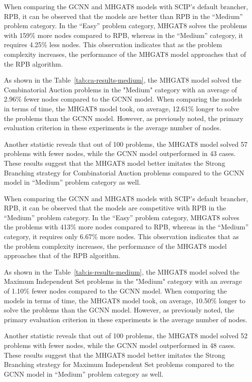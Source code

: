 When comparing the GCNN and MHGAT8 models with SCIP’s default brancher, RPB, it can be observed that the models are better than RPB in the “Medium” problem category.
In the “Easy” problem category, MHGAT8 solves the problems with 159\% more nodes compared to RPB, whereas in the “Medium” category, it requires 4.25\% less nodes.
This observation indicates that as the problem complexity increases, the performance of the MHGAT8 model approaches that of the RPB algorithm.




As shown in the Table~\ref{tab:ca-results-medium}, the MHGAT8 model solved the Combinatorial Auction problems in the "Medium" category with an average of 2.96\% fewer nodes compared to the GCNN model.
When comparing the models in terms of time, the MHGAT8 model took, on average, 12.61\% longer to solve the problems than the GCNN model.
However, as previously noted, the primary evaluation criterion in these experiments is the average number of nodes.


Another statistic reveals that out of 100 problems, the MHGAT8 model solved 57 problems with fewer nodes, while the GCNN model outperformed in 43 cases.
These results suggest that the MHGAT8 model better imitates the Strong Branching strategy for Combinatorial Auction problems compared to the GCNN model in “Medium” problem category as well.


When comparing the GCNN and MHGAT8 models with SCIP’s default brancher, RPB, it can be observed that the models are competitive with RPB in the “Medium” problem category.
In the “Easy” problem category, MHGAT8 solves the problems with 413\% more nodes compared to RPB, whereas in the “Medium” category, it requires only 6.67\% more nodes.
This observation indicates that as the problem complexity increases, the performance of the MHGAT8 model approaches that of the RPB algorithm.




As shown in the Table~\ref{tab:is-results-medium}, the MHGAT8 model solved the Maximum Independent Set problems in the "Medium" category with an average of 1.10\% fewer nodes compared to the GCNN model.
When comparing the models in terms of time, the MHGAT8 model took, on average, 10.50\% longer to solve the problems than the GCNN model.
However, as previously noted, the primary evaluation criterion in these experiments is the average number of nodes.


Another statistic reveals that out of 100 problems, the MHGAT8 model solved 52 problems with fewer nodes, while the GCNN model outperformed in 48 cases.
These results suggest that the MHGAT8 model better imitates the Strong Branching strategy for Maximum Independent Set problems compared to the GCNN model in “Medium” problem category as well.


